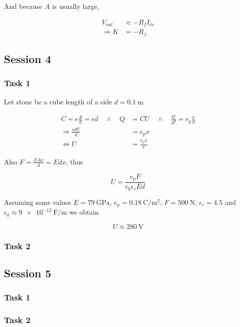 \documentclass[12pt]{article}
\begin{document}
And because $A$ is usually large,

\begin{align*}
V_{out} &\approx -R_f I_{in} \\
\Rightarrow K &= -R_f
\end{align*}

\subsection{Session 4}

\subsubsection{Task 1}

Let stone be a cube length of a side $d = \SI{0.1}{\metre}$.

\begin{align*}
C = \epsilon \frac{A}{d} = \epsilon d \quad \wedge \quad Q &= CU \quad \wedge \quad \frac{Q}{d^2} = e_p \frac{x}{d} \\
\Rightarrow \frac{\epsilon d U}{d} &= e_p x \\
\Leftrightarrow U &= \frac{e_p x}{\epsilon}
\end{align*}

Also $F = \frac{EAx}{d} = Edx$, thus

\begin{equation*}
U = \frac{e_p F}{\epsilon_0 \epsilon_r E d}
\end{equation*}

Assuming some values $E = \SI{79}{\giga\pascal}$, $e_p = \SI{0.18}{\coulomb\per\square\meter}$, $F = \SI{500}{\newton}$, $\epsilon_r = 4.5$ and $\epsilon_0 \approx \SI{9e-12}{\farad\per\meter}$ we obtain

\begin{equation*}
U \approx \SI{280}{\volt}
\end{equation*}


\subsubsection{Task 2}

\subsection{Session 5}

\subsubsection{Task 1}

\subsubsection{Task 2}
\end{document}
